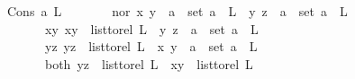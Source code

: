 \begin{isabellebody}
\ {\isacharparenleft}{\kern0pt}Cons\ a\ L{\isacharparenright}{\kern0pt}\isanewline
\ \ \ \ \isamarkupfalse%
\ \isamarkupfalse%
\ {\isacharparenleft}{\kern0pt}nor{\isacharparenright}{\kern0pt}\ {\isachardoublequoteopen}{\isacharparenleft}{\kern0pt}x{\isacharcomma}{\kern0pt}\ y{\isacharparenright}{\kern0pt}\ {\isasymin}\ {\isacharbraceleft}{\kern0pt}a{\isacharbraceright}{\kern0pt}\ {\isasymtimes}\ set\ {\isacharparenleft}{\kern0pt}a\ {\isacharhash}{\kern0pt}\ L{\isacharparenright}{\kern0pt}\ {\isasymand}\ {\isacharparenleft}{\kern0pt}y{\isacharcomma}{\kern0pt}\ z{\isacharparenright}{\kern0pt}\ {\isasymin}\ {\isacharbraceleft}{\kern0pt}a{\isacharbraceright}{\kern0pt}\ {\isasymtimes}\ set\ {\isacharparenleft}{\kern0pt}a\ {\isacharhash}{\kern0pt}\ L{\isacharparenright}{\kern0pt}{\isachardoublequoteclose}\ \isanewline
\ \ \ \ \ \ {\isacharbar}{\kern0pt}\ {\isacharparenleft}{\kern0pt}xy{\isacharparenright}{\kern0pt}\ {\isachardoublequoteopen}{\isacharparenleft}{\kern0pt}x{\isacharcomma}{\kern0pt}y{\isacharparenright}{\kern0pt}\ {\isasymin}\ list{\isacharunderscore}{\kern0pt}to{\isacharunderscore}{\kern0pt}rel\ L\ {\isasymand}\ {\isacharparenleft}{\kern0pt}y{\isacharcomma}{\kern0pt}\ z{\isacharparenright}{\kern0pt}\ {\isasymin}\ {\isacharbraceleft}{\kern0pt}a{\isacharbraceright}{\kern0pt}\ {\isasymtimes}\ set\ {\isacharparenleft}{\kern0pt}a\ {\isacharhash}{\kern0pt}\ L{\isacharparenright}{\kern0pt}{\isachardoublequoteclose}\ \isanewline
\ \ \ \ \ \ {\isacharbar}{\kern0pt}\ {\isacharparenleft}{\kern0pt}yz{\isacharparenright}{\kern0pt}\ {\isachardoublequoteopen}{\isacharparenleft}{\kern0pt}y{\isacharcomma}{\kern0pt}z{\isacharparenright}{\kern0pt}\ {\isasymin}\ list{\isacharunderscore}{\kern0pt}to{\isacharunderscore}{\kern0pt}rel\ L\ {\isasymand}\ {\isacharparenleft}{\kern0pt}x{\isacharcomma}{\kern0pt}\ y{\isacharparenright}{\kern0pt}\ {\isasymin}\ {\isacharbraceleft}{\kern0pt}a{\isacharbraceright}{\kern0pt}\ {\isasymtimes}\ set\ {\isacharparenleft}{\kern0pt}a\ {\isacharhash}{\kern0pt}\ L{\isacharparenright}{\kern0pt}{\isachardoublequoteclose}\isanewline
\ \ \ \ \ \ {\isacharbar}{\kern0pt}\ {\isacharparenleft}{\kern0pt}both{\isacharparenright}{\kern0pt}\ {\isachardoublequoteopen}{\isacharparenleft}{\kern0pt}y{\isacharcomma}{\kern0pt}z{\isacharparenright}{\kern0pt}\ {\isasymin}\ list{\isacharunderscore}{\kern0pt}to{\isacharunderscore}{\kern0pt}rel\ L\ {\isasymand}\ {\isacharparenleft}{\kern0pt}x{\isacharcomma}{\kern0pt}y{\isacharparenright}{\kern0pt}\ {\isasymin}\ list{\isacharunderscore}{\kern0pt}to{\isacharunderscore}{\kern0pt}rel\ L{\isachardoublequoteclose}\ \isamarkupfalse%

\end{isabellebody}
